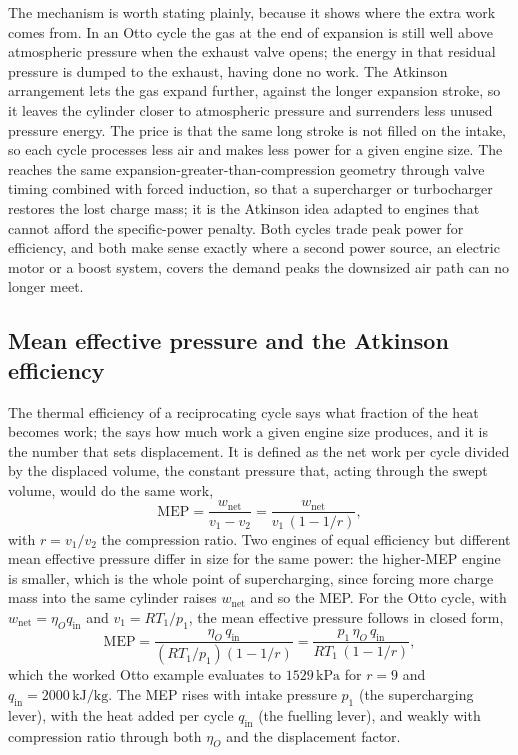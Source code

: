 The mechanism is worth stating plainly, because it shows where the extra
work comes from. In an Otto cycle the gas at the end of expansion is still
well above atmospheric pressure when the exhaust valve opens; the energy
in that residual pressure is dumped to the exhaust, having done no work.
The Atkinson arrangement lets the gas expand further, against the longer
expansion stroke, so it leaves the cylinder closer to atmospheric
pressure and surrenders less unused pressure energy. The price is that
the same long stroke is not filled on the intake, so each cycle processes
less air and makes less power for a given engine size. The
 reaches the same expansion-greater-than-compression
geometry through valve timing combined with forced induction, so that a
supercharger or turbocharger restores the lost charge mass; it is the
Atkinson idea adapted to engines that cannot afford the specific-power
penalty. Both cycles trade peak power for efficiency, and both make sense
exactly where a second power source, an electric motor or a boost system,
covers the demand peaks the downsized air path can no longer meet.

\subsection{Mean effective pressure and the Atkinson efficiency}

The thermal efficiency of a reciprocating cycle says what fraction of the
heat becomes work; the  says how much work a
given engine size produces, and it is the number that sets displacement. It
is defined as the net work per cycle divided by the displaced volume, the
constant pressure that, acting through the swept volume, would do the same
work,
\[
\text{MEP} = \frac{w_{\text{net}}}{v_1 - v_2}
= \frac{w_{\text{net}}}{v_1\,(1 - 1/r)},
\]
with $r = v_1/v_2$ the compression ratio. Two engines of equal efficiency
but different mean effective pressure differ in size for the same power: the
higher-MEP engine is smaller, which is the whole point of supercharging,
since forcing more charge mass into the same cylinder raises $w_{\text{net}}$
and so the MEP. For the Otto cycle, with $w_{\text{net}} = \eta_O
q_{\text{in}}$ and $v_1 = RT_1/p_1$, the mean effective pressure follows in
closed form,
\[
\text{MEP} = \frac{\eta_O\, q_{\text{in}}}{(RT_1/p_1)(1 - 1/r)}
= \frac{p_1\, \eta_O\, q_{\text{in}}}{R T_1\,(1 - 1/r)},
\]
which the worked Otto example evaluates to $1529\,\text{kPa}$ for $r = 9$ and
$q_{\text{in}} = 2000\,\text{kJ}/\text{kg}$. The MEP rises with intake
pressure $p_1$ (the supercharging lever), with the heat added per cycle
$q_{\text{in}}$ (the fuelling lever), and weakly with compression ratio
through both $\eta_O$ and the displacement factor.

